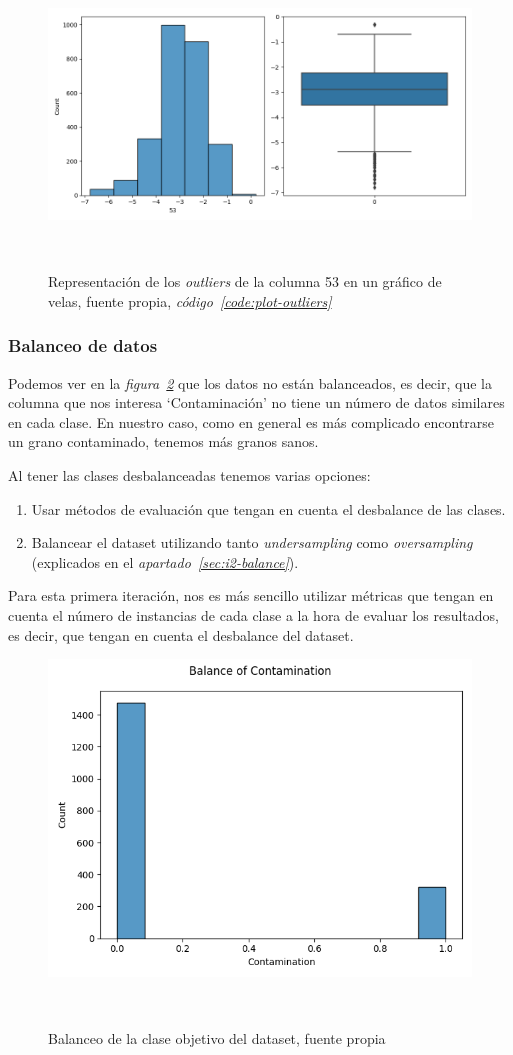 \begin{figure}[!h]
    \centering
    \includegraphics[width=0.7\linewidth]{media/images/col-53-outliers.png}
    \caption{Representación de los \textit{outliers} de la columna 53 en un gráfico de velas, fuente propia, \textit{código\ \ref{code:plot-outliers}}}\ \label{fig:outliers}
\end{figure}


\subsubsection{Balanceo de datos}

Podemos ver en la \textit{figura\ \ref{fig:unbalance}} que los datos no están balanceados, es decir, que la columna que nos interesa `Contaminación' no tiene un número de datos similares en cada clase. En nuestro caso, como en general es más complicado encontrarse un grano contaminado, tenemos más granos sanos.

Al tener las clases desbalanceadas tenemos varias opciones:
\begin{enumerate}
    \item Usar métodos de evaluación que tengan en cuenta el desbalance de las clases.
    \item Balancear el \gls{dataset} utilizando tanto \textit{undersampling} como \textit{oversampling} (explicados en el \textit{apartado\ \ref{sec:i2-balance}}).
\end{enumerate}

Para esta primera iteración, nos es más sencillo utilizar métricas que tengan en cuenta el número de instancias de cada clase a la hora de evaluar los resultados, es decir, que tengan en cuenta el desbalance del \gls{dataset}.

\begin{figure}[!h]
    \centering
    \includegraphics[width=0.7\linewidth]{media/images/unabalance.png}
    \caption{Balanceo de la clase objetivo del \gls{dataset}, fuente propia}\ \label{fig:unbalance}
\end{figure}


